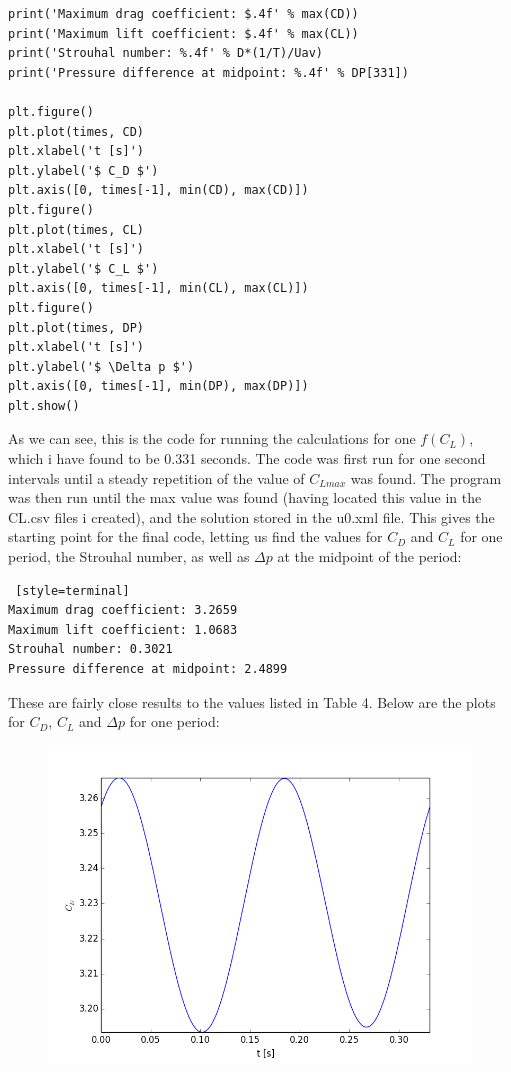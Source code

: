 \documentclass[a4paper,english,11pt,twoside]{article}
\begin{document}
\begin{lstlisting}[style=python]
print('Maximum drag coefficient: $.4f' % max(CD))
print('Maximum lift coefficient: $.4f' % max(CL))
print('Strouhal number: %.4f' % D*(1/T)/Uav)
print('Pressure difference at midpoint: %.4f' % DP[331])

plt.figure()
plt.plot(times, CD)
plt.xlabel('t [s]')
plt.ylabel('$ C_D $')
plt.axis([0, times[-1], min(CD), max(CD)])
plt.figure()
plt.plot(times, CL)
plt.xlabel('t [s]')
plt.ylabel('$ C_L $')
plt.axis([0, times[-1], min(CL), max(CL)])
plt.figure()
plt.plot(times, DP)
plt.xlabel('t [s]')
plt.ylabel('$ \Delta p $')
plt.axis([0, times[-1], min(DP), max(DP)])
plt.show()
\end{lstlisting}

As we can see, this is the code for running the calculations for one $f(C_L)$, which i have found to be 0.331 seconds. The code was first run for one second intervals until a steady repetition of the value of $C_{Lmax}$ was found. The program was then run until the max value was found (having located this value in the CL.csv files i created), and the solution stored in the u0.xml file. This gives the starting point for the final code, letting us find the values for $C_D$ and $C_L$ for one period, the Strouhal number, as well as $\Delta p$ at the midpoint of the period:\\
\begin{lstlisting} [style=terminal]
Maximum drag coefficient: 3.2659
Maximum lift coefficient: 1.0683
Strouhal number: 0.3021
Pressure difference at midpoint: 2.4899
\end{lstlisting}
These are fairly close results to the values listed in Table 4. Below are the plots for $C_D$, $C_L$ and $\Delta p$ for one period:\\
\begin{figure}[h!]
\includegraphics[scale=0.7]{2b_figure_1.png}
\end{figure}
\end{document}
